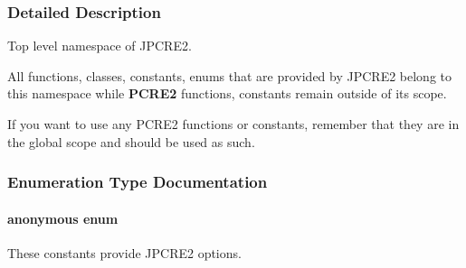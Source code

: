 \subsubsection{Detailed Description}
Top level namespace of J\+P\+C\+R\+E2. 

All functions, classes, constants, enums that are provided by J\+P\+C\+R\+E2 belong to this namespace while {\bfseries P\+C\+R\+E2} functions, constants remain outside of its scope.

If you want to use any P\+C\+R\+E2 functions or constants, remember that they are in the global scope and should be used as such. 

\subsubsection{Enumeration Type Documentation}
\paragraph[{\texorpdfstring{anonymous enum}{anonymous enum}}]{\setlength{\rightskip}{0pt plus 5cm}anonymous enum}\hypertarget{namespacejpcre2_a85c143271501e383843f45b9999c2f00}{}\label{namespacejpcre2_a85c143271501e383843f45b9999c2f00}


These constants provide J\+P\+C\+R\+E2 options. 

